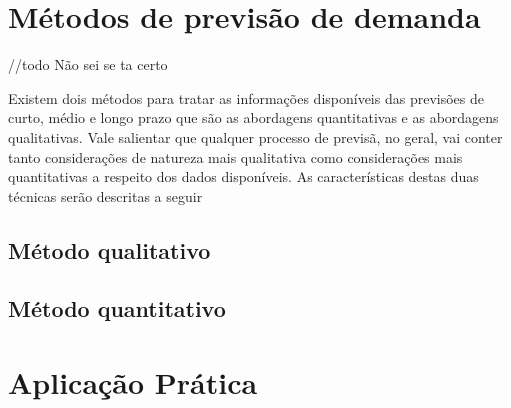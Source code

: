 \section{Métodos de previsão de demanda}
//todo Não sei se ta certo

Existem dois métodos para tratar as informações disponíveis das previsões de curto, médio e longo prazo que são as abordagens quantitativas e as abordagens qualitativas. Vale salientar que qualquer processo de previsã, no geral, vai conter tanto considerações de natureza mais qualitativa como considerações mais quantitativas a respeito dos dados disponíveis. As características destas duas técnicas serão descritas a seguir 

\subsection{Método qualitativo}

\subsection{Método quantitativo}

\section{Aplicação Prática} 
\label{sec:introducao_ao_planejamento_aplicacao}

